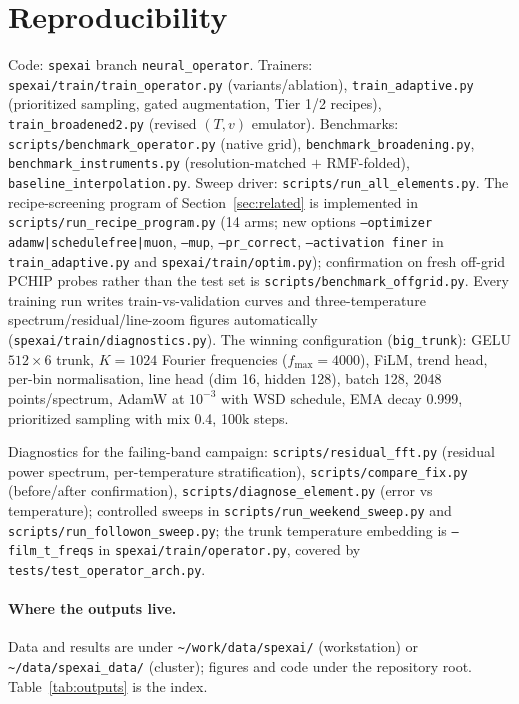 \documentclass[11pt,a4paper]{article}
\newcommand{\code}[1]{\texttt{#1}}
\begin{document}
\section*{Reproducibility}

Code: \code{spexai} branch \code{neural\_operator}. Trainers:
\code{spexai/train/train\_operator.py} (variants/ablation),
\code{train\_adaptive.py} (prioritized sampling, gated augmentation,
Tier 1/2 recipes), \code{train\_broadened2.py} (revised $(T,v)$
emulator). Benchmarks: \code{scripts/benchmark\_operator.py} (native
grid), \code{benchmark\_broadening.py}, \code{benchmark\_instruments.py}
(resolution-matched $+$ RMF-folded), \code{baseline\_interpolation.py}.
Sweep driver: \code{scripts/run\_all\_elements.py}. The recipe-screening
program of Section~\ref{sec:related} is implemented in
\code{scripts/run\_recipe\_program.py} (14 arms; new options
\code{--optimizer adamw|schedulefree|muon}, \code{--mup},
\code{--pr\_correct}, \code{--activation finer} in \code{train\_adaptive.py}
and \code{spexai/train/optim.py}); confirmation on fresh off-grid PCHIP
probes rather than the test set is \code{scripts/benchmark\_offgrid.py}. Every training run
writes train-vs-validation curves and three-temperature
spectrum/residual/line-zoom figures automatically
(\code{spexai/train/diagnostics.py}). The winning configuration
(\code{big\_trunk}): GELU $512\times6$ trunk, $K=1024$ Fourier
frequencies ($f_{\max}=4000$), FiLM, trend head, per-bin normalisation,
line head (dim 16, hidden 128), batch 128, 2048 points/spectrum, AdamW
at $10^{-3}$ with WSD schedule, EMA decay 0.999, prioritized sampling
with mix 0.4, 100k steps.

Diagnostics for the failing-band campaign:
\code{scripts/residual\_fft.py} (residual power spectrum, per-temperature
stratification), \code{scripts/compare\_fix.py} (before/after
confirmation), \code{scripts/diagnose\_element.py} (error vs
temperature); controlled sweeps in \code{scripts/run\_weekend\_sweep.py}
and \code{scripts/run\_followon\_sweep.py}; the trunk temperature
embedding is \code{--film\_t\_freqs} in \code{spexai/train/operator.py},
covered by \code{tests/test\_operator\_arch.py}.

\paragraph{Where the outputs live.} Data and results are under
\code{\textasciitilde/work/data/spexai/} (workstation) or
\code{\textasciitilde/data/spexai\_data/} (cluster); figures and code
under the repository root. Table~\ref{tab:outputs} is the index.
\end{document}
